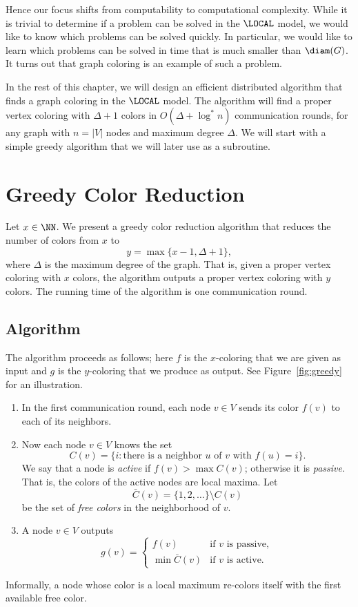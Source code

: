 Hence our focus shifts from computability to computational complexity. While it is trivial to determine if a problem can be solved in the $\LOCAL$ model, we would like to know which problems can be solved quickly. In particular, we would like to learn which problems can be solved in time that is much smaller than $\diam(G)$. It turns out that graph coloring is an example of such a problem.

In the rest of this chapter, we will design an efficient distributed algorithm that finds a graph coloring in the $\LOCAL$ model. The algorithm will find a proper vertex coloring with $\Delta+1$ colors in $O(\Delta + \log^* n)$ communication rounds, for any graph with $n = |V|$ nodes and maximum degree $\Delta$. We will start with a simple greedy algorithm that we will later use as a subroutine.


\section{Greedy Color Reduction} \label{sec:bdgreedy}

Let $x \in \NN$. We present a greedy color reduction algorithm that reduces the number of colors from $x$ to
\[
    y = \max \{ x-1, \Delta+1 \},
\]
where $\Delta$ is the maximum degree of the graph. That is, given a proper vertex coloring with $x$ colors, the algorithm outputs a proper vertex coloring with $y$ colors. The running time of the algorithm is one communication round.

\subsection{Algorithm}

The algorithm proceeds as follows; here $f$ is the $x$-coloring that we are given as input and $g$ is the $y$-coloring that we produce as output. See Figure~\ref{fig:greedy} for an illustration.
\begin{enumerate}
    \item In the first communication round, each node $v \in V$ sends its color $f(v)$ to each of its neighbors.
    \item Now each node $v \in V$ knows the set
    \[
        C(v) = \{ i : \text{there is a neighbor $u$ of $v$ with $f(u) = i$} \}.
    \]
    We say that a node is \emph{active} if $f(v) > \max C(v)$; otherwise it is \emph{passive}. That is, the colors of the active nodes are local maxima. Let
    \[
        \bar{C}(v) = \{1,2,\dotsc\} \setminus C(v)
    \]
    be the set of \emph{free colors} in the neighborhood of $v$.
    \item A node $v \in V$ outputs
    \[
        g(v) = \begin{cases}
            f(v) & \text{if $v$ is passive}, \\
            \min \bar{C}(v) & \text{if $v$ is active}.
        \end{cases}
    \]
\end{enumerate}
Informally, a node whose color is a local maximum re-colors itself with the first available free color.

